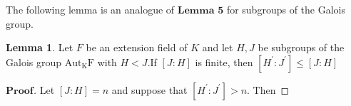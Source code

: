 \documentclass[a4paper, 11pt]{article}
\theoremstyle{remark}
\newenvironment{myprf}
{\renewcommand\qedsymbol{$ $}\begin{proof}[$\mathbf{Proof}$]}
  {\end{proof}}
\theoremstyle{definition}
\newtheorem{lemma}[theorem]{Lemma}
\begin{document}
    \vspace{0.5cm}
    The following lemma is an analogue of $\textbf{Lemma 5}$ for subgroups of the Galois 
    group.
    \vspace{0.5cm}
    \begin{lemma}
            Let $F$ be an extension field of $K$ and let $H,J$ be subgroups of the Galois
            group $\mathrm{Aut_KF}$ with $H<J$.If $[J:H]$ is finite, then 
            $[H^{'}:J^{'}]\leq [J:H]$

    \end{lemma}
    \vspace{0.1cm}
    \begin{myprf}
        Let $[J:H]=n$ and suppose that $[H^{'}:J^{'}]>n$. Then 
            
    \end{myprf}
    
\end{document}
